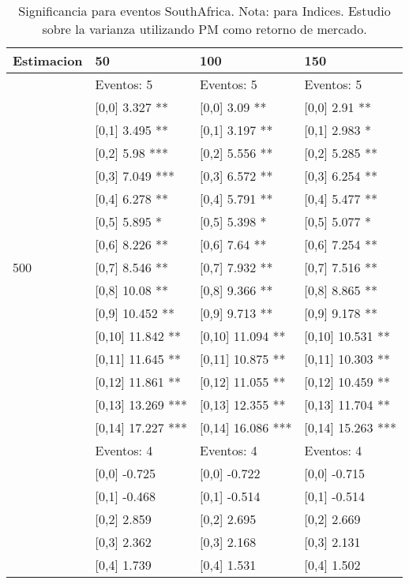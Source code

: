 \begin{table}

\caption{Significancia para eventos SouthAfrica. Nota: para Indices. Estudio sobre la varianza utilizando PM como retorno de mercado.}
\centering
\begin{tabular}[t]{llll}
\toprule
Estimacion & 50 & 100 & 150\\
\midrule
 & Eventos:  5 & Eventos:  5 & Eventos:  5\\
 & {}[0,0] 3.327 ** & {}[0,0] 3.09 ** & {}[0,0] 2.91 **\\
 & {}[0,1] 3.495 ** & {}[0,1] 3.197 ** & {}[0,1] 2.983 *\\
 & {}[0,2] 5.98 *** & {}[0,2] 5.556 ** & {}[0,2] 5.285 **\\
 & {}[0,3] 7.049 *** & {}[0,3] 6.572 ** & {}[0,3] 6.254 **\\
\addlinespace
 & {}[0,4] 6.278 ** & {}[0,4] 5.791 ** & {}[0,4] 5.477 **\\
 & {}[0,5] 5.895 * & {}[0,5] 5.398 * & {}[0,5] 5.077 *\\
 & {}[0,6] 8.226 ** & {}[0,6] 7.64 ** & {}[0,6] 7.254 **\\
500 & {}[0,7] 8.546 ** & {}[0,7] 7.932 ** & {}[0,7] 7.516 **\\
 & {}[0,8] 10.08 ** & {}[0,8] 9.366 ** & {}[0,8] 8.865 **\\
\addlinespace
 & {}[0,9] 10.452 ** & {}[0,9] 9.713 ** & {}[0,9] 9.178 **\\
 & {}[0,10] 11.842 ** & {}[0,10] 11.094 ** & {}[0,10] 10.531 **\\
 & {}[0,11] 11.645 ** & {}[0,11] 10.875 ** & {}[0,11] 10.303 **\\
 & {}[0,12] 11.861 ** & {}[0,12] 11.055 ** & {}[0,12] 10.459 **\\
 & {}[0,13] 13.269 *** & {}[0,13] 12.355 ** & {}[0,13] 11.704 **\\
\addlinespace
 & {}[0,14] 17.227 *** & {}[0,14] 16.086 *** & {}[0,14] 15.263 ***\\
 & Eventos:  4 & Eventos:  4 & Eventos:  4\\
 & {}[0,0] -0.725 & {}[0,0] -0.722 & {}[0,0] -0.715\\
 & {}[0,1] -0.468 & {}[0,1] -0.514 & {}[0,1] -0.514\\
 & {}[0,2] 2.859 & {}[0,2] 2.695 & {}[0,2] 2.669\\
\addlinespace
 & {}[0,3] 2.362 & {}[0,3] 2.168 & {}[0,3] 2.131\\
 & {}[0,4] 1.739 & {}[0,4] 1.531 & {}[0,4] 1.502\\

\end{tabular}
\end{table}
